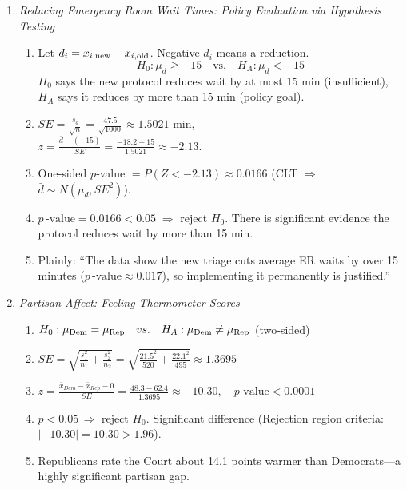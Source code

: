 \documentclass{article}
\begin{document}
\begin{enumerate}
\item \emph{Reducing Emergency Room Wait Times: Policy Evaluation via Hypothesis Testing}
\begin{enumerate}[label=(\alph*)]
  \item 
    Let $d_i = x_{i,\rm new}-x_{i,\rm old}$.  Negative $d_i$ means a reduction.  
    \[
      H_0:\mu_d \ge -15
      \quad\text{vs.}\quad
      H_A:\mu_d < -15
    \]
    $H_0$ says the new protocol reduces wait by at most 15 min (insufficient), $H_A$ says it reduces by more than 15 min (policy goal).
  \item 
    $SE = \frac{s_d}{\sqrt{n}}=\frac{47.5}{\sqrt{1000}}\approx1.5021$ min,\\
    $z=\frac{\bar d-(-15)}{SE}=\frac{-18.2+15}{1.5021}\approx-2.13$.
  \item 
    One‐sided $p$‑value $=P(Z<-2.13)\approx0.0166$ (CLT $\Rightarrow$ $\bar d\sim N(\mu_d,SE^2)$).
  \item 
    $p\,\text{-value}=0.0166<0.05\;\Rightarrow$ reject $H_0$.  There is significant evidence the protocol reduces wait by more than 15 min.
  \item 
    Plainly: “The data show the new triage cuts average ER waits by over 15 minutes ($p\,\text{-value}\approx0.017$), so implementing it permanently is justified.” 
\end{enumerate}

\item \emph{Partisan Affect: Feeling Thermometer Scores}
\begin{enumerate}[label=(\alph*)]
  \item 
    $H_0:\mu_{\rm Dem}=\mu_{\rm Rep}\quad vs.\quad H_A:\mu_{\rm Dem}\neq\mu_{\rm Rep}$ (two‐sided)
  \item 
    $SE=\sqrt{\frac{s_1^2}{n_1}+\frac{s_2^2}{n_2}}=\sqrt{\frac{21.5^2}{520}+\frac{22.1^2}{495}}\approx1.3695$
  \item 
    $z=\frac{\bar x_{Dem} - \bar x_{Rep}  - 0}{SE}=\frac{48.3-62.4}{1.3695}\approx-10.30,\quad p\text{-value}<0.0001$  
  \item 
    $p<0.05\, \Rightarrow$ reject $H_0$.  Significant difference (Rejection region criteria: $|-10.30|=10.30>1.96$).
  \item 
    Republicans rate the Court about 14.1 points warmer than Democrats—a highly significant partisan gap.
\end{enumerate}

\end{enumerate} %
\end{document}
